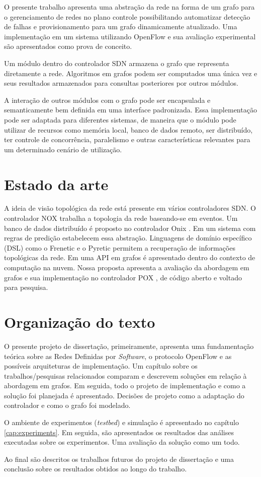 O presente trabalho apresenta uma abstração da rede na forma de um grafo 
para o gerenciamento de redes no plano controle possibilitando automatizar 
detecção de falhas e provisionamento para um grafo dinamicamente atualizado.
Uma implementação em um sistema utilizando OpenFlow \citep{nick2008openflow}
e sua avaliação experimental são apresentados como prova de conceito.

Um módulo dentro do controlador SDN armazena o grafo que representa diretamente
a rede.
Algoritmos em grafos podem ser computados uma única vez e seus resultados 
armazenados para consultas posteriores por outros módulos.

A interação de outros módulos com o grafo pode ser encapsulada e 
semanticamente bem definida em uma interface padronizada.
Essa implementação pode ser adaptada para diferentes sistemas, de maneira que
o módulo pode utilizar de recursos como memória local, banco de dados remoto,
ser distribuído, ter controle de concorrência, paralelismo e outras 
características relevantes para um determinado cenário de utilização.

\section{Estado da arte}

A ideia de visão topológica da rede está presente em vários controladores SDN.
O controlador NOX \citep{gude2008nox} trabalha a topologia da rede baseando-se
em eventos.
Um banco de dados distribuído é proposto no controlador Onix 
\citep{teemu2010onix}.
Em \citep{hinrichs2009pratical} um sistema com regras de predição 
estabelecem essa abstração.
Linguagens de domínio específico (DSL) como o Frenetic 
\citep{foster2011frenetic} e o Pyretic \citep{monsanto2013composing} permitem
a recuperação de informações topológicas da rede.
Em \citep{ramya2012dynamic} uma API em grafos é apresentado dentro do contexto
de computação na nuvem.
Nossa proposta apresenta a avaliação da abordagem em grafos e sua implementação
no controlador POX \citep{pox2015}, de código aberto e voltado para pesquisa.

\section{Organização do texto}

O presente projeto de dissertação, primeiramente, apresenta uma fundamentação
teórica sobre as Redes Definidas por \emph{Software}, o protocolo OpenFlow e
as possíveis arquiteturas de implementação.
Um capítulo sobre os trabalhos/pesquisas relacionados comparam e descrevem
soluções em relação à abordagem em grafos.
Em seguida, todo o projeto de implementação e como a solução foi planejada
é apresentado. 
Decisões de projeto como a adaptação do controlador e como o grafo foi 
modelado.

O ambiente de experimentos (\emph{testbed}) e simulação é apresentado no 
capítulo \ref{cap:experiments}.
Em seguida, são apresentados os resultados das análises executadas sobre os
experimentos.
Uma avaliação da solução como um todo.

Ao final são descritos os trabalhos futuros do projeto de dissertação e uma
conclusão sobre os resultados obtidos ao longo do trabalho.
